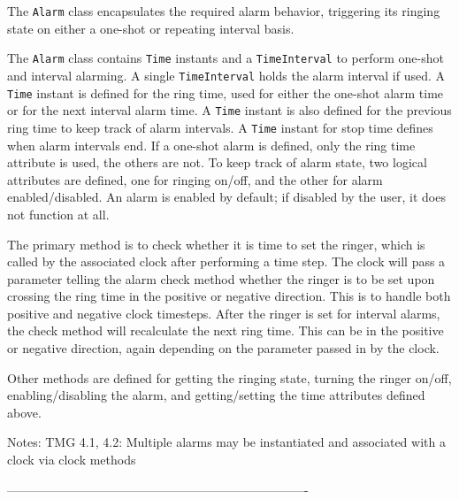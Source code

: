    The {\tt Alarm} class encapsulates the required alarm behavior, triggering
   its ringing state on either a one-shot or repeating interval basis.
  
   The {\tt Alarm} class contains {\tt Time} instants and a {\tt TimeInterval}
   to perform one-shot and interval alarming.  A single {\tt TimeInterval}
   holds the alarm interval if used.  A {\tt Time} instant is defined for the
   ring time, used for either the one-shot alarm time or for the next interval
   alarm time.  A {\tt Time} instant is also defined for the previous ring
   time to keep track of alarm intervals.  A {\tt Time} instant for stop time
   defines when alarm intervals end.  If a one-shot alarm is defined, only
   the ring time attribute is used, the others are not.  To keep track of
   alarm state, two logical attributes are defined, one for ringing on/off,
   and the other for alarm enabled/disabled.  An alarm is enabled by default;
   if disabled by the user, it does not function at all.
  
   The primary method is to check whether it is time to set the ringer, which
   is called by the associated clock after performing a time step.  The clock
   will pass a parameter telling the alarm check method whether the ringer is
   to be set upon crossing the ring time in the positive or negative direction.
   This is to handle both positive and negative clock timesteps.  After the
   ringer is set for interval alarms, the check method will recalculate the
   next ring time.  This can be in the positive or negative direction, again
   depending on the parameter passed in by the clock.
  
   Other methods are defined for getting the ringing state, turning the
   ringer on/off, enabling/disabling the alarm, and getting/setting the
   time attributes defined above.
  
   Notes:
      TMG 4.1, 4.2:  Multiple alarms may be instantiated and associated
                     with a clock via clock methods
  
  -------------------------------------------------------------------------
  
